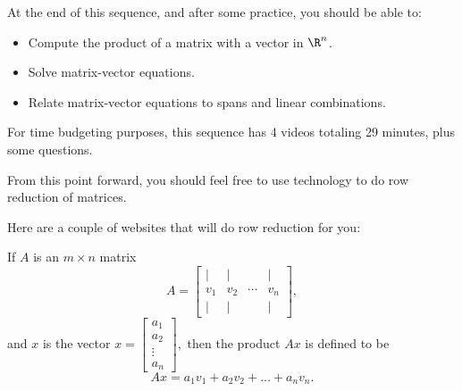 







At the end of this sequence, and after some practice, you should be able to:

\begin{itemize}
\item Compute the product of a matrix with a vector in $\R^n$.   
\item Solve matrix-vector equations.
\item Relate matrix-vector equations to spans and linear combinations.  
\end{itemize}


For time budgeting purposes, this sequence has 4 videos totaling 29 minutes, 
plus some questions.  




\endedxtext

\endedxvertical



From this point forward, you should feel free to use technology to do row reduction of matrices.  

Here are a couple of websites that will do row reduction for you:




\endedxtext

\endedxvertical





If $A$ is an $m\times n$ matrix
\[ A = \left[ \begin{array}{cccc} | & | & & | \\ 
v_1 & v_2 & \cdots & v_n \\
 | & | & & | \end{array} \right], \] and $x$ is the vector $x = \left[\begin{array}{c} a_1 \\ a_2 \\ \vdots \\ a_n
\end{array} \right],$ then 
the product $Ax$ is defined to be 
\[ Ax = a_1 v_1 + a_2 v_2 + \ldots + a_n v_n.\]


